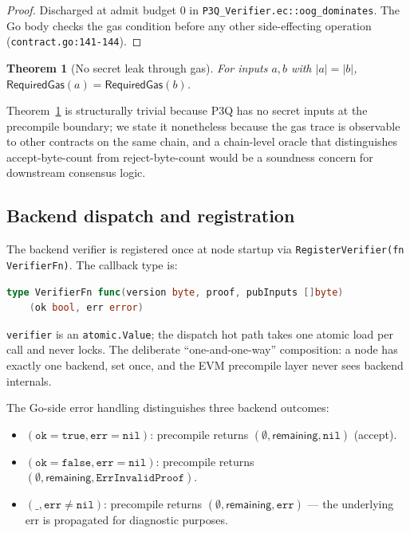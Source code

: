 \documentclass[11pt,a4paper]{article}
\newtheorem{theorem}{Theorem}
\begin{document}
\begin{proof}
Discharged at admit budget $0$ in
\texttt{P3Q\_Verifier.ec::oog\_dominates}. The Go body checks the gas
condition before any other side-effecting operation
(\texttt{contract.go:141-144}).
\end{proof}

\begin{theorem}[No secret leak through gas]\label{thm:gas-noleak}
For inputs $a, b$ with $|a| = |b|$,
$\mathsf{RequiredGas}(a) = \mathsf{RequiredGas}(b)$.
\end{theorem}

\noindent
Theorem~\ref{thm:gas-noleak} is structurally trivial because P3Q has
no secret inputs at the precompile boundary; we state it nonetheless
because the gas trace is observable to other contracts on the same
chain, and a chain-level oracle that distinguishes accept-byte-count
from reject-byte-count would be a soundness concern for downstream
consensus logic.

\subsection{Backend dispatch and registration}

The backend verifier is registered once at node startup via
\texttt{RegisterVerifier(fn VerifierFn)}. The callback type is:

\begin{lstlisting}[language=Go]
type VerifierFn func(version byte, proof, pubInputs []byte)
    (ok bool, err error)
\end{lstlisting}

\noindent
\texttt{verifier} is an \texttt{atomic.Value}; the dispatch hot path
takes one atomic load per call and never locks. The deliberate
``one-and-one-way'' composition: a node has exactly one backend, set
once, and the EVM precompile layer never sees backend internals.

The Go-side error handling distinguishes three backend outcomes:
\begin{itemize}
\item $(\mathtt{ok}=\mathtt{true}, \mathtt{err}=\mathtt{nil})$: precompile returns
$(\emptyset, \mathsf{remaining}, \mathtt{nil})$ (accept).
\item $(\mathtt{ok}=\mathtt{false}, \mathtt{err}=\mathtt{nil})$: precompile returns
$(\emptyset, \mathsf{remaining}, \mathtt{ErrInvalidProof})$.
\item $(\_, \mathtt{err}\ne\mathtt{nil})$: precompile returns
$(\emptyset, \mathsf{remaining}, \mathtt{err})$ — the underlying err
is propagated for diagnostic purposes.
\end{itemize}
\end{document}
